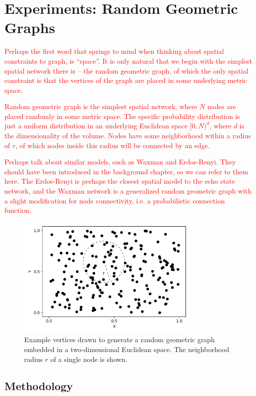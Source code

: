 \chapter{Experiments: Random Geometric Graphs}

\textcolor{red}{
  Perhaps the first word that springs to mind when thinking about spatial
constraints to graph, is ``space''. It is only natural that we begin with the
simplest spatial network there is -- the random geometric graph, of which the
only spatial constraint is that the vertices of the graph are placed in some
underlying metric space.
}

\textcolor{red}{
  Random geometric graph is the simplest spatial network, where $N$ nodes are
placed randomly in some metric space. The specific probability distribution is
just a uniform distribution in an underlying Euclidean space $[0, N)^d$, where
$d$ is the dimensionality of the volume. Nodes have some neighborhood within a
radius of $r$, of which nodes inside this radius will be connected by an edge.
}

\textcolor{red}{
  Perhaps talk about similar models, such as Waxman and Erdos-Renyi. They should
have been introduced in the background chapter, so we can refer to them
here. The Erdos-Renyi is perhaps the closest spatial model to the echo state
network, and the Waxman network is a generalized random geometric graph with a
slight modification for node connectivity, i.e. a probabilistic connection
function.
}

\begin{figure}[t]
  \centering
  \includegraphics[width=3.5in]{figures/RGG-example.png}
  \caption{
    Example vertices drawn to generate a random geometric graph embedded in a
two-dimensional Euclidean space. The neighborhood radius $r$ of a single node is
shown.
  }
  \label{fig:rgg-example}
\end{figure}

\section{Methodology}

